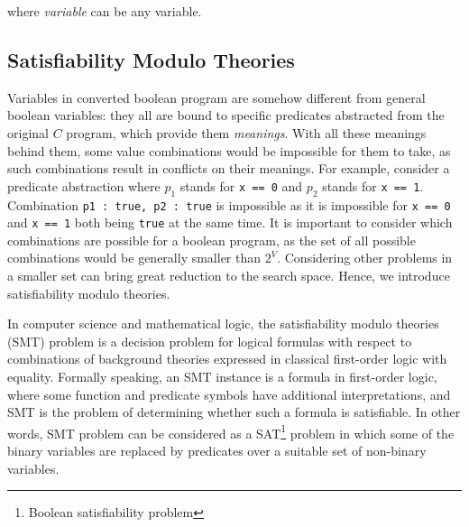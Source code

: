 where \textit{variable} can be any variable.

\subsection{Satisfiability Modulo Theories}
\label{section:SatisifiabilityModuloTheories}
Variables in converted boolean program are somehow different from general boolean variables: they all are bound to specific predicates abstracted from the original $C$ program, which provide them {\it meanings}.
With all these meanings behind them, some value combinations would be impossible for them to take, as such combinations result in conflicts on their meanings.
For example, consider a predicate abstraction where $p_{1}$ stands for \lstinline|x == 0| and $p_{2}$ stands for \lstinline|x == 1|.
Combination \lstinline|p1 : true, p2 : true| is impossible as it is impossible for \lstinline|x == 0| and \lstinline|x == 1| both being \lstinline|true| at the same time.
It is important to consider which combinations are possible for a boolean program, as the set of all possible combinations would be generally smaller than $2^{V}$.
Considering other problems in a smaller set can bring great reduction to the search space.
Hence, we introduce satisfiability modulo theories.

In computer science and mathematical logic, the satisfiability modulo theories (SMT) problem\cite{SMT} is a decision problem for logical formulas with respect to combinations of background theories expressed in classical first-order logic with equality.
Formally speaking, an SMT instance is a formula in first-order logic, where some function and predicate symbols have additional interpretations, and SMT is the problem of determining whether such a formula is satisfiable.
In other words, SMT problem can be considered as a SAT\footnote{Boolean satisfiability problem} problem in which some of the binary variables are replaced by predicates over a suitable set of non-binary variables\cite{BSAT:SMT}.

